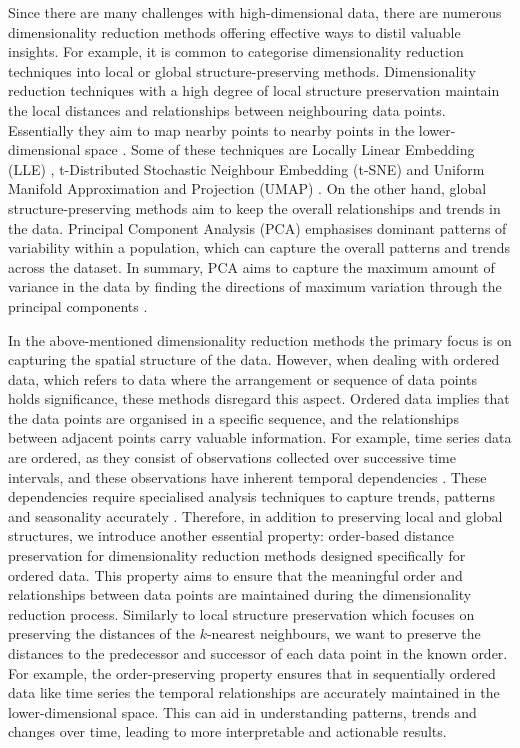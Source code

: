 \documentclass[pdftex,12pt,a4paper]{report}
\begin{document}
Since there are many challenges with high-dimensional data, there are numerous dimensionality reduction methods offering effective ways to distil valuable insights.
For example, it is common to categorise dimensionality reduction techniques into local or global structure-preserving methods.
Dimensionality reduction techniques with a high degree of local structure preservation maintain the local distances and relationships between neighbouring data points.
Essentially they aim to map nearby points to nearby points in the lower-dimensional space \cite{global-vs-local-nonlinear-dim-reduction}.
Some of these techniques are Locally Linear Embedding (LLE) \cite{LLE}, t-Distributed Stochastic Neighbour Embedding (t-SNE) \cite{t-SNE} and Uniform Manifold Approximation and Projection (UMAP) \cite{umap-implementation}.
On the other hand, global structure-preserving methods aim to keep the overall relationships and trends in the data.
Principal Component Analysis (PCA) emphasises dominant patterns of variability within a population, which can capture the overall patterns and trends across the dataset.
In summary, PCA aims to capture the maximum amount of variance in the data by finding the directions of maximum variation through the principal components \cite{PCA-global-structure-preserving}.

In the above-mentioned dimensionality reduction methods the primary focus is on capturing the spatial structure of the data.
However, when dealing with ordered data, which refers to data where the arrangement or sequence of data points holds significance, these methods disregard this aspect.
Ordered data implies that the data points are organised in a specific sequence, and the relationships between adjacent points carry valuable information.
For example, time series data are ordered, as they consist of observations collected over successive time intervals, and these observations have inherent temporal dependencies \cite{dropp}.
These dependencies require specialised analysis techniques to capture trends, patterns and seasonality accurately \cite{dropp} \cite{PCA-joliffe}.
Therefore, in addition to preserving local and global structures, we introduce another essential property: order-based distance preservation for dimensionality reduction methods designed specifically for ordered data.
This property aims to ensure that the meaningful order and relationships between data points are maintained during the dimensionality reduction process.
Similarly to local structure preservation which focuses on preserving the distances of the $k$-nearest neighbours, we want to preserve the distances to the predecessor and successor of each data point in the known order.
For example, the order-preserving property ensures that in sequentially ordered data like time series the temporal relationships are accurately maintained in the lower-dimensional space.
This can aid in understanding patterns, trends and changes over time, leading to more interpretable and actionable results.
\end{document}
